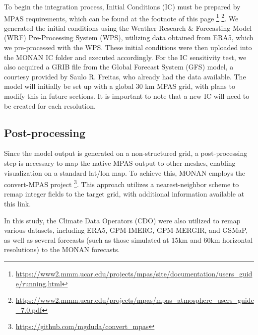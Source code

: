 To begin the integration process, Initial Conditions (IC) must be prepared by MPAS requirements, which can be found at the footnote of this page \footnote{\url{https://www2.mmm.ucar.edu/projects/mpas/site/documentation/users_guide/running.html}}
\footnote{\url{https://www2.mmm.ucar.edu/projects/mpas/mpas_atmosphere_users_guide_7.0.pdf}}.
We generated the initial conditions using the Weather Research \& Forecasting Model (WRF) Pre-Processing System (WPS), utilizing data obtained from ERA5, which we pre-processed with the WPS. These initial conditions were then uploaded into the MONAN IC folder and executed accordingly. For the IC sensitivity test, we also acquired a GRIB file from the Global Forecast System (GFS) model, a courtesy provided by Saulo R. Freitas, who already had the data available. The model will initially be set up with a global 30 km MPAS grid, with plans to modify this in future sections. It is important to note that a new IC will need to be created for each resolution.

\subsection{Post-processing}

Since the model output is generated on a non-structured grid, a post-processing step is necessary to map the native MPAS output to other meshes, enabling visualization on a standard lat/lon map. To achieve this, MONAN employs the convert-MPAS project \footnote{\url{https://github.com/mgduda/convert_mpas}}. This approach utilizes a nearest-neighbor scheme to remap integer fields to the target grid, with additional information available at this link.

In this study, the Climate Data Operators (CDO) were also utilized to remap various datasets, including ERA5, GPM-IMERG, GPM-MERGIR, and GSMaP, as well as several forecasts (such as those simulated at 15km and 60km horizontal resolutions) to the MONAN forecasts.
